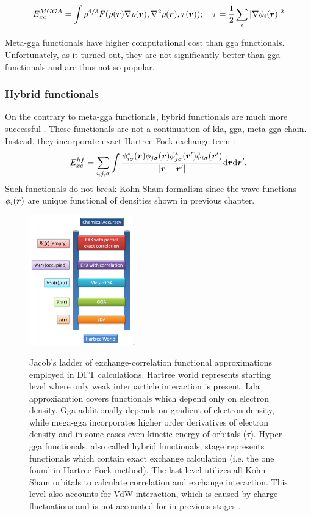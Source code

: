 \documentclass[openany, longbibliography,slovene,a4paper,12pt]{article}
\def\vec#1{\mbox{\boldmath$#1$}}
\newcommand{\dif}{\mathrm{d}}
\begin{document}
\begin{equation}
  E_{xc}^{MGGA}= \int \rho^{4/3}F(\rho(\vec r) \nabla \rho(\vec r), \nabla^2 \rho(\vec r), \tau(\vec r)); \quad \tau=\frac{1}{2}\sum_i |\nabla \phi_i(\vec r)|^2
   \end{equation}

Meta-gga functionals have higher computational cost than gga functionals.
Unfortunately, as it turned out, they are not significantly better than gga
functionals and are thus not so popular.


\subsubsection{Hybrid functionals}
On the contrary to meta-gga functionals, hybrid functionals are much more
successful \cite{challenges_den_fun_theor}. These functionals are not a
continuation of lda, gga, meta-gga chain. Instead, they incorporate exact
Hartree-Fock exchange term \cite{challenges_den_fun_theor}:
\begin{equation}
  E^{hf}_{xc}=\sum_ {i,j,\sigma}\int\frac{\phi^*_{i\sigma}(\vec r) \phi_{j\sigma}(\vec r) \phi^*_{j\sigma}(\vec r') \phi_{i\sigma}(\vec r')}{|\vec r - \vec r'|}\dif \vec r \dif \vec r'.
\end{equation}
Such functionals do not break Kohn Sham formalism since the wave functions
$\phi_i(\vec r)$ are unique functional of densities shown in previous chapter.


\begin{figure}[!ht]
  \centering
  \includegraphics[width=0.4\textwidth]{jacobs_functional_ladder_ver2.png}.
  \caption{Jacob’s ladder of exchange-correlation functional approximations
    employed in DFT calculations. Hartree world represents starting level where only
    weak interparticle interaction is present. Lda approxiamtion covers
    functionals which depend only on electron density. Gga additionally depends
    on gradient of electron density, while mega-gga incorporates higher order
    derivatives of electron density and in some cases even kinetic energy of
    orbitals ($\tau$). Hyper-gga functionals, also called hybrid functionals,
    stage represents functionals which contain exact exchange calculation (i.e.
    the one found in Hartree-Fock method). The last level utilizes all Kohn-Sham
    orbitals to calculate correlation and exchange interaction. This level also
    accounts for VdW interaction, which is caused by charge fluctuations and is
    not accounted for in previous stages \cite{How_theo_simul_can_address}.
  }
  \label{bijection}
\end{figure}
\end{document}
